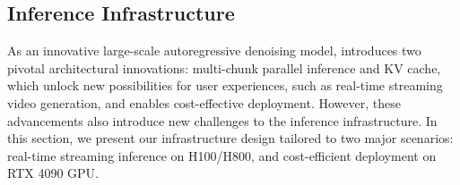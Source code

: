 \subsection{Inference Infrastructure}
As an innovative large-scale autoregressive denoising model, \magi introduces two pivotal architectural innovations: multi-chunk parallel inference and KV cache, which unlock new possibilities for user experiences, such as real-time streaming video generation, and enables cost-effective deployment. However, these advancements also introduce new challenges to the inference infrastructure. In this section, we present our infrastructure design tailored to two major scenarios: real-time streaming inference on H100/H800, and cost-efficient deployment on RTX 4090 GPU.



